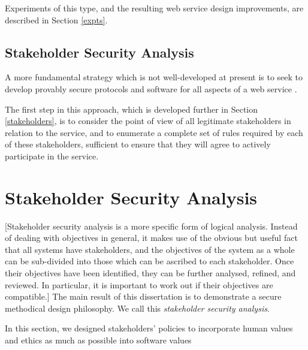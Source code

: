 Experiments of this type, and the resulting web service design improvements,
are described in Section \ref{expts}.



\subsection{Stakeholder Security Analysis}\label{stsecanal}

A more fundamental strategy which is not well-developed at present is
to seek to develop provably secure protocols and software for all aspects
of a web service \cite{whitman2011principles,mailloux2018examination,bishop2005introduction}.

The first step in this approach, which is developed further in 
Section \ref{stakeholders}, is to consider the point of view of all legitimate stakeholders
in relation to the service, and to enumerate a complete set of rules
required by each of these stakeholders, sufficient to ensure that they
will agree to actively participate in the service.


\section{Stakeholder Security Analysis}

[Stakeholder security analysis is a more specific form of logical analysis. Instead of dealing with
objectives in general, it makes use of the obvious but useful fact that all systems have
stakeholders, and the objectives of the system as a whole can be sub-divided into those
which can be ascribed to each stakeholder. Once their objectives have been identified, they
can be further analysed, refined, and reviewed. In particular, it is important to work out if
their objectives are compatible.]
The main result of this dissertation is to demonstrate  a secure methodical design philosophy.
We call this {\em stakeholder security analysis}.

In this section, we designed stakeholders' policies to incorporate human
values and ethics as much as possible into software values

